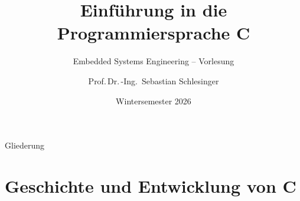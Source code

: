\documentclass[%
  aspectratio=169,
  10pt
]{beamer}
\title[Einführung in C]{Einführung in die Programmiersprache C}
\subtitle{Embedded Systems Engineering -- Vorlesung}
\author[Schlesinger]{Prof.\,Dr.\,-Ing.\ Sebastian Schlesinger}
\institute{%
  Fachbereich 2 -- Duales Studium Wirtschaft \& Technik\\
  HWR Berlin}
\date{Wintersemester 2026}
\begin{document}

\begin{frame}[plain]
  \titlepage
\end{frame}

\begin{frame}{Gliederung}
  \tableofcontents
\end{frame}

\section{Geschichte und Entwicklung von C}
\end{document}
